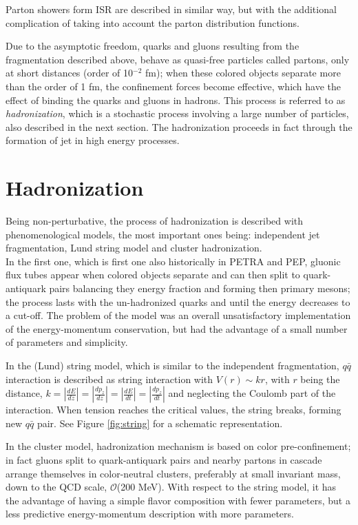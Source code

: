 Parton showers form ISR are described in similar way, but with the additional complication of taking into account the parton distribution functions.

Due to the asymptotic freedom, quarks and gluons resulting from the fragmentation described above, behave as quasi-free particles called partons, only at short distances (order of 10$^{-2}$ fm); when these colored objects separate more than the order of 1 fm, the confinement forces become effective, which have the effect of binding the quarks and gluons in hadrons. This process is referred to as \textit{hadronization}, which is a stochastic process involving a large number of particles, also described in the next section. The hadronization proceeds in fact through the formation of jet in high energy processes.

\section{Hadronization} %

Being non-perturbative, the process of hadronization is described with phenomenological models, the most important ones being: independent jet fragmentation, Lund string model and cluster hadronization.\\

In the first one, which is first one also historically in PETRA and PEP, gluonic flux tubes appear when colored objects separate and can then split to quark-antiquark pairs balancing they energy fraction and forming then primary mesons; the process lasts with the un-hadronized quarks and until the energy decreases to a cut-off. The problem of the model was an overall unsatisfactory implementation of the energy-momentum conservation, but had the advantage of a small number of parameters and simplicity.

In the (Lund) string model, which is similar to the independent fragmentation, $q\bar{q}$ interaction is described as string interaction with $V(r)\sim kr$, with $r$ being the distance, $k=|\frac{dE}{dz}|=|\frac{dp_z}{dz}|=|\frac{dE}{dt}|=|\frac{dp_z}{dt}|$ and neglecting the Coulomb part of the interaction. When tension reaches the critical values, the string breaks, forming new $q\bar{q}$ pair. See Figure \ref{fig:string} for a schematic representation. 

In the cluster model, hadronization mechanism is based on color pre-confinement; in fact gluons split to quark-antiquark pairs and nearby partons in cascade arrange themselves in color-neutral clusters, preferably at small invariant mass, down to the QCD scale, $\mathcal{O}$(200 MeV). With respect to the string model, it has the advantage of having a simple flavor composition with fewer parameters, but a less predictive energy-momentum description with more parameters.

